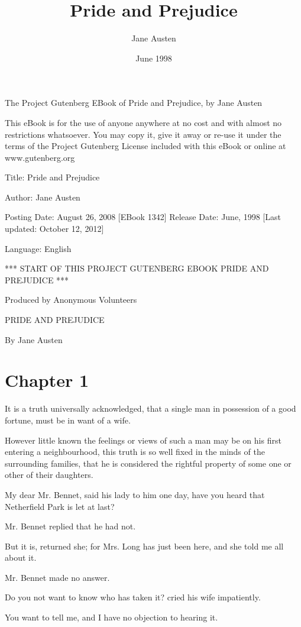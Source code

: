 \documentclass[twocolumn]{article}
\title{Pride and Prejudice}
\author{Jane Austen}
\date{June 1998}
\begin{document}
\maketitle

The Project Gutenberg EBook of Pride and Prejudice, by Jane Austen

This eBook is for the use of anyone anywhere at no cost and with
almost no restrictions whatsoever.  You may copy it, give it away or
re-use it under the terms of the Project Gutenberg License included
with this eBook or online at www.gutenberg.org


Title: Pride and Prejudice

Author: Jane Austen

Posting Date: August 26, 2008 [EBook 1342]
Release Date: June, 1998
[Last updated: October 12, 2012]

Language: English


*** START OF THIS PROJECT GUTENBERG EBOOK PRIDE AND PREJUDICE ***




Produced by Anonymous Volunteers





PRIDE AND PREJUDICE

By Jane Austen

\section{Chapter 1}


It is a truth universally acknowledged, that a single man in possession
of a good fortune, must be in want of a wife.

However little known the feelings or views of such a man may be on his
first entering a neighbourhood, this truth is so well fixed in the minds
of the surrounding families, that he is considered the rightful property
of some one or other of their daughters.

My dear Mr. Bennet, said his lady to him one day, have you heard that
Netherfield Park is let at last?

Mr. Bennet replied that he had not.

But it is, returned she; for Mrs. Long has just been here, and she
told me all about it.

Mr. Bennet made no answer.

Do you not want to know who has taken it? cried his wife impatiently.

You want to tell me, and I have no objection to hearing it.
\end{document}
